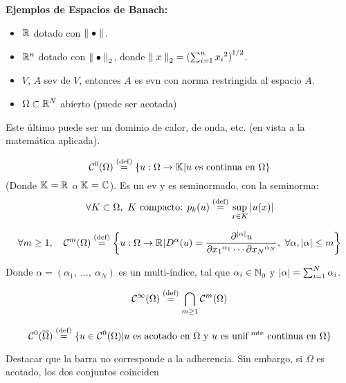 
\renewcommand{\catnum}{1} %
\renewcommand{\fecha}{09 de marzo de 2020}


{\Large \bf Ejemplos de Espacios de Banach:}

\begin{itemize}
    \item $\rr$ dotado con $\norm{\bullet}$.
    \item $\rr[n]$ dotado con $\norm[2]{\bullet}$, donde $\norm[2]{x} = {(\sum_{i=1}^{n} {x_i}^{2})}^{1/2}$.
    \item $V$, $A$ sev de $V$, entonces $A$ es evn con norma restringida al espacio $A$.
    \item $\Omega \subset \rr[N]$ abierto (puede ser acotada)
\end{itemize}
Este último puede ser un dominio de calor, de onda, etc. (en vista a la matemática aplicada).
 
\begin{defn}
$$\Cf[0]{\Omega} \defeq \{ u:\Omega \to \kk | u \text{ es continua en } \Omega \}$$
(Donde $\kk = \rr$ o $\kk = \cc$). Es un ev y es seminormado, con la seminorma:
$$\forall K \subset \Omega, \ K \text{ compacto: } p_{k}(u) \defeq \sup_{x \in K} \abs{u(x)}$$
\end{defn}

\begin{defn}
$$\forall m \geq 1, \quad \Cf[m]{\Omega} \defeq 
\left\{
u:\Omega \to \rr |D^{\alpha}(u) = \frac{\p^{\abs{\alpha}} u}{\p {x_1}^{\alpha_1} \cdots \p {x_N}^{\alpha_N}}, \ \forall \alpha, \abs{\alpha} \leq m
\right\}$$

Donde $\alpha = (\alpha_1, \ \ldots, \ \alpha_N)$ es un multi-índice, tal que $\alpha_i \in \nn_{0}$ y $\abs{\alpha} = \sum_{i=1}^{N} \alpha_i$.
\end{defn}

\begin{defn}\MarginNote{$\Cf[\infty]{\Omega}$}
$$\Cf[\infty]{\Omega} \defeq \bigcap_{m \geq 1} \Cf[m]{\Omega} $$
\end{defn}

\begin{defn}\MarginNote{$\Cf[0]{\bOmega}$}
$$\Cf[0]{\bOmega} \defeq \{
u \in \Cf[0]{\Omega} | u \text{ es acotado en $\Omega$ y $u$ es unif\mte continua en } \Omega
\}$$
\end{defn}
Destacar que la barra no corresponde a la adherencia. Sin embargo, si $\Omega$ es acotado, los dos conjuntos coinciden

